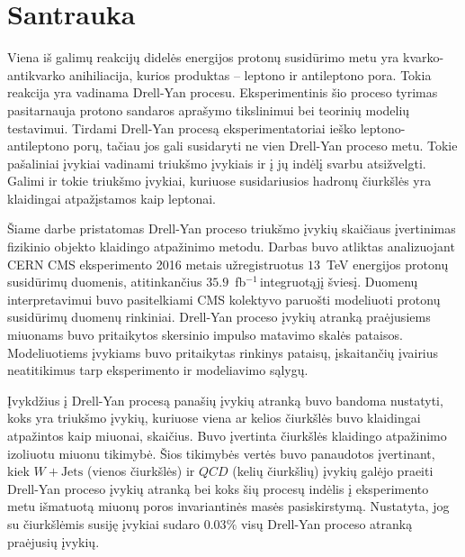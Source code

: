 \documentclass[a4paper, 12pt, oneside]{article}
\newcommand{\WJets}{W\! +\!\mathrm{Jets}}
\newcommand{\invfb}{fb$^{-1}\,$}
\newcommand{\QCD}{QC\! D}
\begin{document}
\vspace{2cm}



\section*{Santrauka}
Viena iš galimų reakcijų didelės energijos protonų susidūrimo metu yra kvarko-antikvarko anihiliacija, kurios
produktas -- leptono ir antileptono pora.
Tokia reakcija yra vadinama Drell-Yan procesu.
Eksperimentinis šio proceso tyrimas pasitarnauja protono sandaros aprašymo tikslinimui bei teorinių modelių testavimui.
Tirdami Drell-Yan procesą eksperimentatoriai ieško leptono-antileptono porų, tačiau jos gali susidaryti ne vien
Drell-Yan proceso metu.
Tokie pašaliniai įvykiai vadinami triukšmo įvykiais ir į jų indėlį svarbu atsižvelgti.
Galimi ir tokie triukšmo įvykiai, kuriuose susidariusios hadronų čiurkšlės yra klaidingai atpažįstamos kaip leptonai.

Šiame darbe pristatomas Drell-Yan proceso triukšmo įvykių skaičiaus įvertinimas fizikinio objekto klaidingo
atpažinimo metodu.
Darbas buvo atliktas analizuojant CERN CMS eksperimento 2016 metais užregistruotus
$13$~TeV energijos protonų susidūrimų duomenis, atitinkančius $35.9$~\invfb integruotąjį šviesį.
Duomenų interpretavimui buvo pasitelkiami CMS kolektyvo paruošti modeliuoti protonų susidūrimų duomenų rinkiniai.
Drell-Yan proceso įvykių atranką praėjusiems miuonams buvo pritaikytos skersinio impulso matavimo skalės pataisos.
Modeliuotiems įvykiams buvo pritaikytas rinkinys pataisų, įskaitančių įvairius neatitikimus tarp eksperimento
ir modeliavimo sąlygų.

Įvykdžius į Drell-Yan procesą panašių įvykių atranką buvo bandoma nustatyti, koks yra triukšmo įvykių, kuriuose
viena ar kelios čiurkšlės buvo klaidingai atpažintos kaip miuonai, skaičius.
Buvo įvertinta čiurkšlės klaidingo atpažinimo izoliuotu miuonu tikimybė.
Šios tikimybės vertės buvo panaudotos įvertinant, kiek $\WJets$ (vienos čiurkšlės) ir $\QCD$ (kelių čiurkšlių)
įvykių galėjo praeiti Drell-Yan proceso įvykių atranką bei koks šių procesų indėlis į eksperimento metu
išmatuotą miuonų poros invariantinės masės pasiskirstymą.
Nustatyta, jog su čiurkšlėmis susiję įvykiai sudaro $0.03\%$ visų Drell-Yan proceso atranką praėjusių įvykių.
\end{document}
